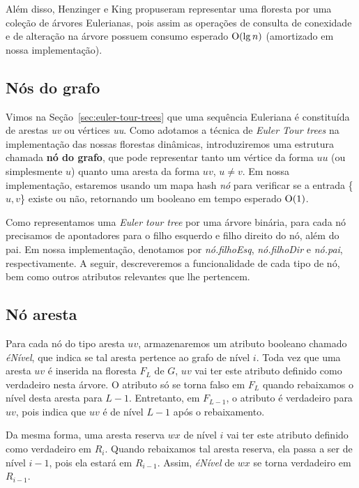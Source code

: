 Além disso, Henzinger e King \cite{henzinger_king} propuseram representar uma floresta por uma coleção de árvores Eulerianas, pois assim as operações de consulta de conexidade e de alteração na árvore possuem consumo esperado $\mathrm{O}(\lg n)$ (amortizado em nossa implementação).

\subsection{Nós do grafo}
\label{sec:graph-nodes}

Vimos na Seção~\ref{sec:euler-tour-trees} que uma sequência Euleriana é constituída de arestas \textit{uv} ou vértices \textit{uu}. 
Como adotamos a técnica de \textit{Euler Tour trees} na implementação das nossas florestas dinâmicas, introduziremos uma estrutura chamada \textbf{nó do grafo}, que pode representar tanto um vértice da forma $uu$ (ou simplesmente $u$) quanto uma aresta da forma $uv$, $u \neq v$. Em nossa implementação, estaremos usando um mapa hash \textit{nó} para verificar se a entrada \{$u, v$\} existe ou não, retornando um booleano em tempo esperado $\mathrm{O}(1)$.

Como representamos uma \textit{Euler tour tree} por uma árvore binária, para cada nó precisamos de apontadores para o filho esquerdo e filho direito do nó, além do pai. Em nossa implementação, denotamos por \textit{nó.filhoEsq}, \textit{nó.filhoDir} e \textit{nó.pai}, respectivamente. A seguir, descreveremos a funcionalidade de cada tipo de nó, bem como outros atributos relevantes que lhe pertencem. 

\subsection{Nó aresta}
\label{sec:node-edge}

Para cada nó do tipo aresta $uv$, armazenaremos um atributo booleano chamado \textit{éNível}, que indica se tal aresta pertence ao grafo de nível $i$. Toda vez que uma aresta $uv$ é inserida na floresta $F_L$ de $G$, $uv$ vai ter este atributo definido como verdadeiro nesta árvore. O atributo só se torna falso em $F_L$ quando rebaixamos o nível desta aresta para $L-1$. Entretanto, em $F_{L-1}$, o atributo é verdadeiro para $uv$, pois indica que $uv$ é de nível $L-1$ após o rebaixamento.

Da mesma forma, uma aresta reserva $wx$ de nível $i$ vai ter este atributo definido como verdadeiro em $R_i$. Quando rebaixamos tal aresta reserva, ela passa a ser de nível $i-1$, pois ela estará em $R_{i-1}$. Assim, \textit{éNível} de $wx$ se torna verdadeiro em $R_{i-1}$.


